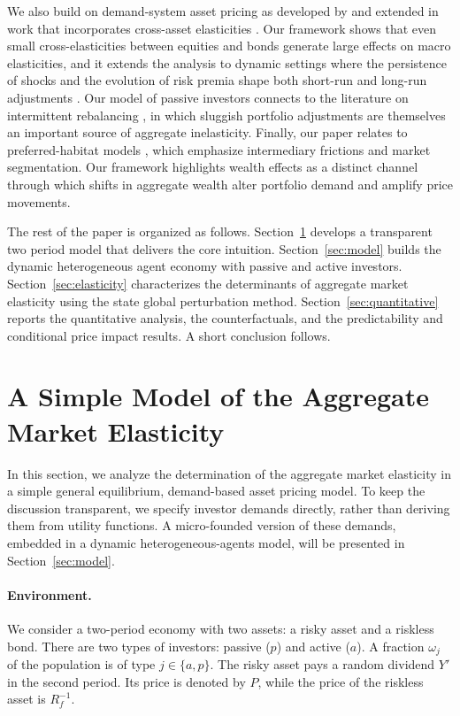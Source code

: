 \documentclass[12pt,english]{article}
\begin{document}
We also build on demand-system asset pricing as developed by \citet{Koijen/Yogo/19} and extended in work that incorporates cross-asset elasticities \citep{fuchs2023demand,haddad2025causal}.
Our framework shows that even small cross-elasticities between equities and bonds generate large effects on macro elasticities, and it extends the analysis to dynamic settings where the persistence of shocks and the evolution of risk premia shape both short-run and long-run adjustments \citep{Binsbergen-David-Opp2025,he-kondor-Li2025demand,DKLS}.
Our model of passive investors connects to the literature on intermittent rebalancing \citep{ChienColeLustig2012}, in which sluggish portfolio adjustments are themselves an important source of aggregate inelasticity.
Finally, our paper relates to preferred-habitat models \citep{VayanosVila2021,KekreLenelMainardi2025,RayDroste2025}, which emphasize intermediary frictions and market segmentation.
Our framework highlights wealth effects as a distinct channel through which shifts in aggregate wealth alter portfolio demand and amplify price movements. 

The rest of the paper is organized as follows.
Section~\ref{sec:simple} develops a transparent two period model that delivers the core intuition.
Section~\ref{sec:model} builds the dynamic heterogeneous agent economy with passive and active investors.
Section~\ref{sec:elasticity} characterizes the determinants of aggregate market elasticity using the state global perturbation method.
Section~\ref{sec:quantitative} reports the quantitative analysis, the counterfactuals, and the predictability and conditional price impact results.
A short conclusion follows.



%  
\section{A Simple Model of the Aggregate Market Elasticity}\label{sec:simple}

In this section, we analyze the determination of the aggregate market elasticity in a simple general equilibrium, demand-based asset pricing model.
To keep the discussion transparent, we specify investor demands directly, rather than deriving them from utility functions.
A micro-founded version of these demands, embedded in a dynamic heterogeneous-agents model, will be presented in Section~\ref{sec:model}.

\paragraph{Environment.}
We consider a two-period economy with two assets: a risky asset and a riskless bond.
There are two types of investors: passive ($p$) and active ($a$).
A fraction $\omega_j$ of the population is of type $j \in \{a,p\}$.
The risky asset pays a random dividend $Y'$ in the second period.
Its price is denoted by $P$, while the price of the riskless asset is $R_f^{-1}$.
\end{document}
